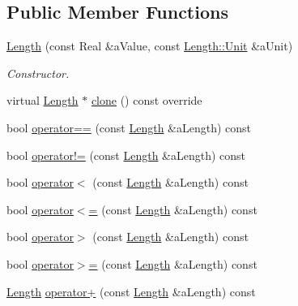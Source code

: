 \subsection*{Public Member Functions}
\begin{DoxyCompactItemize}
\item 
\hyperlink{classostk_1_1physics_1_1units_1_1_length_ae42146342ec60e8430fc111974c12366}{Length} (const Real \&a\+Value, const \hyperlink{classostk_1_1physics_1_1units_1_1_length_a2664470a7eedf5d45c88861fe69badea}{Length\+::\+Unit} \&a\+Unit)
\begin{DoxyCompactList}\small\item\em Constructor. \end{DoxyCompactList}\item 
virtual \hyperlink{classostk_1_1physics_1_1units_1_1_length}{Length} $\ast$ \hyperlink{classostk_1_1physics_1_1units_1_1_length_aeeb9cf27e0ea9bd818ad806cf3083658}{clone} () const override
\item 
bool \hyperlink{classostk_1_1physics_1_1units_1_1_length_ad3ee7b62d8dbfc4cbb626a5573092df0}{operator==} (const \hyperlink{classostk_1_1physics_1_1units_1_1_length}{Length} \&a\+Length) const
\item 
bool \hyperlink{classostk_1_1physics_1_1units_1_1_length_ab2f0fcca55d97a7d27d27b24ffba5e8c}{operator!=} (const \hyperlink{classostk_1_1physics_1_1units_1_1_length}{Length} \&a\+Length) const
\item 
bool \hyperlink{classostk_1_1physics_1_1units_1_1_length_aa90a1a4caa9d0343a2b6395a27f30417}{operator$<$} (const \hyperlink{classostk_1_1physics_1_1units_1_1_length}{Length} \&a\+Length) const
\item 
bool \hyperlink{classostk_1_1physics_1_1units_1_1_length_a065e01d99187bb5c6decf7b2a507a91c}{operator$<$=} (const \hyperlink{classostk_1_1physics_1_1units_1_1_length}{Length} \&a\+Length) const
\item 
bool \hyperlink{classostk_1_1physics_1_1units_1_1_length_a3a57f59386ae63906c8143c7dbfeb90e}{operator$>$} (const \hyperlink{classostk_1_1physics_1_1units_1_1_length}{Length} \&a\+Length) const
\item 
bool \hyperlink{classostk_1_1physics_1_1units_1_1_length_a365ab9cd6546cdbe76a05082a5ff88da}{operator$>$=} (const \hyperlink{classostk_1_1physics_1_1units_1_1_length}{Length} \&a\+Length) const
\item 
\hyperlink{classostk_1_1physics_1_1units_1_1_length}{Length} \hyperlink{classostk_1_1physics_1_1units_1_1_length_a75f9cc6530d47b20f5f0204f452b21ff}{operator+} (const \hyperlink{classostk_1_1physics_1_1units_1_1_length}{Length} \&a\+Length) const

\end{DoxyCompactItemize}
